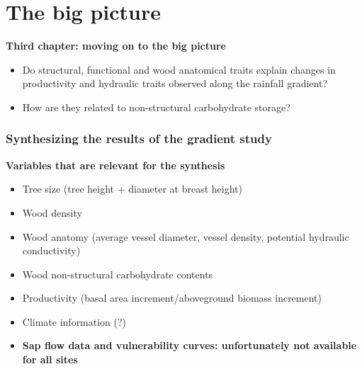 \documentclass[usepdftitle=false]{beamer}
\newcommand{\Blue}[1]{{\color{blue!50!black}\textbf{#1}}}
\begin{document}
\section{The big picture}
\begin{frame}
	\begin{block}{\textbf{Third chapter: moving on to the big picture}}
		\begin{itemize}
			\item Do structural, functional and wood anatomical traits explain changes in productivity and hydraulic traits observed along the rainfall gradient? 
			\item How are they related to non-structural carbohydrate storage?
		\end{itemize}
	\end{block}	
\end{frame}

\begin{frame}
	\frametitle{Synthesizing the results of the gradient study}	\Blue{Variables that are relevant for the synthesis}
	\begin{itemize}[<+-| alert@+>]
		\item Tree size (tree height + diameter at breast height)
		\item Wood density
		\item Wood anatomy (average vessel diameter, vessel density, potential hydraulic conductivity)
		\item Wood non-structural carbohydrate contents
		\item Productivity (basal area increment/aboveground biomass increment)
		\item Climate information (?)
		\item<visible@+| alert@+> \textbf{Sap flow data and vulnerability curves: unfortunately not available for all sites}		
	\end{itemize}	
\end{frame}
\end{document}
